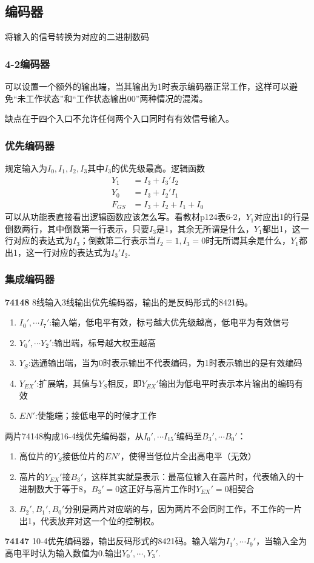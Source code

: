 \documentclass{ctexart}
\newcommand*{\noindbf}[1]{{\noindent \bf{#1} \qquad}}
\begin{document}
\subsection{编码器}
将输入的信号转换为对应的二进制数码
\subsubsection{4-2编码器}
可以设置一个额外的输出端，当其输出为1时表示编码器正常工作，这样可以避免“未工作状态”和“工作状态输出00”两种情况的混淆。

缺点在于四个入口不允许任何两个入口同时有有效信号输入。
\subsubsection{优先编码器}
规定输入为$I_0,I_1,I_2,I_3$其中$I_3$的优先级最高。逻辑函数
\begin{align}
    Y_1&=I_3+I_3'I_2\\
    Y_0&=I_3+I_2'I_1\\
    F_{GS}&=I_3+I_2+I_1+I_0
\end{align}
可以从功能表直接看出逻辑函数应该怎么写。看教材p124表6-2，$Y_1$对应出1的行是倒数两行，其中倒数第一行表示，只要$I_3$是1，其余无所谓是什么，$Y_1$都出1，这一行对应的表达式为$I_3$；倒数第二行表示当$I_2=1,I_3=0$时无所谓其余是什么，$Y_1$都出1，这一行对应的表达式为$I_3'I_2$.
\subsubsection{集成编码器}
\noindbf{74148}8线输入3线输出优先编码器，输出的是反码形式的8421码。
\begin{enumerate}
    \item $I_0',\cdots I_7'$:输入端，低电平有效，标号越大优先级越高，低电平为有效信号
    \item $Y_0',\cdots Y_2'$:输出端，标号越大权重越高
    \item $Y_S$:选通输出端，当为0时表示输出不代表编码，为1时表示输出的是有效编码
    \item $Y_{EX}'$:扩展端，其值与$Y_S$相反，即$Y_{EX}'$输出为低电平时表示本片输出的编码有效
    \item $EN'$:使能端；接低电平的时候才工作
\end{enumerate}
两片74148构成16-4线优先编码器，从$I_0',\cdots I_{15}'$编码至$B_3',\cdots B_0'$：
\begin{enumerate}
    \item 高位片的$Y_{S}$接低位片的$EN'$，使得当低位片全出高电平（无效）
    \item 高片的$Y_{EX}'$接$B_3'$，这样其实就是表示：最高位输入在高片时，代表输入的十进制数大于等于8，$B_3'=0$这正好与高片工作时$Y_{EX}'=0$相契合
    \item $B_2',B_1',B_0'$分别是两片对应端的与，因为两片不会同时工作，不工作的一片出1，代表放弃对这一个位的控制权。
\end{enumerate}
\noindbf{74147} 10-4优先编码器，输出反码形式的8421码。输入端为$I_1',\cdots I_9'$，当输入全为高电平时认为输入数值为0.输出$Y_0',\cdots ,Y_3'$.
\end{document}
